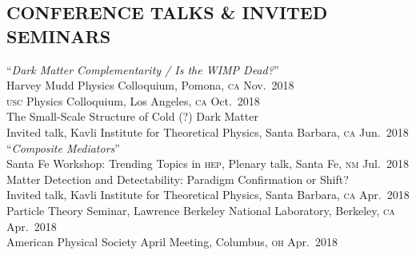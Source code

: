 \documentclass[margin,line]{resume}
\newcommand{\mytalksep}{-.1mm}
\newcommand{\mytalkskip}{2mm}
\newcommand{\scap}[1]{\textsc{\MakeLowercase{#1}}}
\begin{document}
\begin{resume}
\vspace{-2mm}


\section{\footnotesize \sc
\sffamily 
{}
CONFERENCE 
TALKS \&
INVITED SEMINARS
}

``\emph{Dark Matter Complementarity / Is the WIMP Dead?}'' 
\vspace{\mytalksep}\\ 
Harvey Mudd Physics Colloquium, Pomona, \scap{CA}
\hfill %
Nov.~2018
\vspace{\mytalksep}\\ 
\scap{USC} Physics Colloquium, Los Angeles, \scap{CA}
\hfill %
Oct.~2018
\vspace{\mytalksep}\\ 
The Small-Scale Structure of Cold (?) Dark Matter\\
	Invited talk, Kavli Institute for Theoretical Physics, Santa Barbara, \scap{CA}
\hfill %
Jun.~2018
\vspace{\mytalkskip}\\   
%
%
%
``\emph{Composite Mediators}'' 
\vspace{\mytalksep}\\ 
Santa Fe Workshop: Trending Topics in \scap{HEP}, %
Plenary talk, Santa Fe, \scap{NM}
\hfill %
Jul.~2018\vspace{\mytalksep}\\  
%
Matter Detection and Detectability: Paradigm Confirmation or Shift?\\
Invited talk, Kavli Institute for Theoretical Physics, Santa Barbara, \scap{CA}
\hfill %
Apr.~2018\vspace{\mytalksep}\\  
%
Particle Theory Seminar, Lawrence Berkeley National Laboratory, Berkeley, \scap{CA}
\hfill %
Apr.~2018\vspace{\mytalksep}\\  
%
American Physical Society April Meeting, Columbus, \scap{OH}
\hfill %
Apr.~2018\vspace{\mytalksep}\\  

\end{resume}
\end{document}
